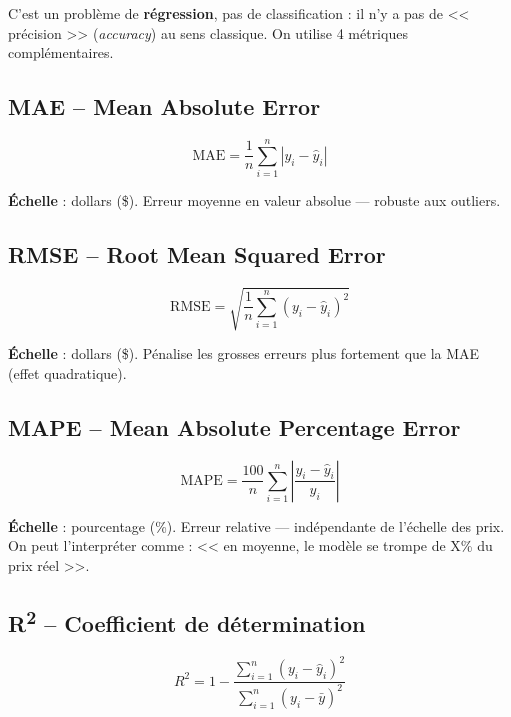 \documentclass[a4paper,11pt]{article}
\begin{document}
C'est un probl\`eme de \textbf{r\'egression}, pas de classification : il n'y a pas de << pr\'ecision >> (\textit{accuracy}) au sens classique. On utilise 4 m\'etriques compl\'ementaires.

\subsection{MAE -- Mean Absolute Error}

\begin{equation}
\text{MAE} = \frac{1}{n}\sum_{i=1}^{n} |y_i - \hat{y}_i|
\end{equation}

\textbf{\'Echelle} : dollars (\$). Erreur moyenne en valeur absolue --- robuste aux outliers.

\subsection{RMSE -- Root Mean Squared Error}

\begin{equation}
\text{RMSE} = \sqrt{\frac{1}{n}\sum_{i=1}^{n} (y_i - \hat{y}_i)^2}
\end{equation}

\textbf{\'Echelle} : dollars (\$). P\'enalise les grosses erreurs plus fortement que la MAE (effet quadratique).

\subsection{MAPE -- Mean Absolute Percentage Error}

\begin{equation}
\text{MAPE} = \frac{100}{n}\sum_{i=1}^{n} \left|\frac{y_i - \hat{y}_i}{y_i}\right|
\end{equation}

\textbf{\'Echelle} : pourcentage (\%). Erreur relative --- ind\'ependante de l'\'echelle des prix. On peut l'interpr\'eter comme : << en moyenne, le mod\`ele se trompe de X\% du prix r\'eel >>.

\subsection{R\textsuperscript{2} -- Coefficient de d\'etermination}

\begin{equation}
R^2 = 1 - \frac{\sum_{i=1}^{n}(y_i - \hat{y}_i)^2}{\sum_{i=1}^{n}(y_i - \bar{y})^2}
\end{equation}
\end{document}
